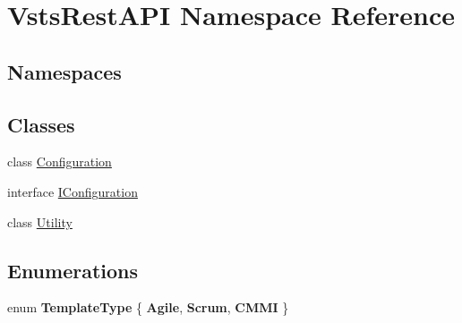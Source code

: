 \hypertarget{namespace_vsts_rest_a_p_i}{}\section{Vsts\+Rest\+A\+PI Namespace Reference}
\label{namespace_vsts_rest_a_p_i}
\subsection*{Namespaces}
\begin{DoxyCompactItemize}
\end{DoxyCompactItemize}
\subsection*{Classes}
\begin{DoxyCompactItemize}
\item 
class \mbox{\hyperlink{class_vsts_rest_a_p_i_1_1_configuration}{Configuration}}
\item 
interface \mbox{\hyperlink{interface_vsts_rest_a_p_i_1_1_i_configuration}{I\+Configuration}}
\item 
class \mbox{\hyperlink{class_vsts_rest_a_p_i_1_1_utility}{Utility}}
\end{DoxyCompactItemize}
\subsection*{Enumerations}
\begin{DoxyCompactItemize}
\item 
\mbox{\label{namespace_vsts_rest_a_p_i_a74bd20c1966666e9f933d3495f4908ec}} 
enum {\bfseries Template\+Type} \{ {\bfseries Agile}, 
{\bfseries Scrum}, 
{\bfseries C\+M\+MI}
 \}
\end{DoxyCompactItemize}
